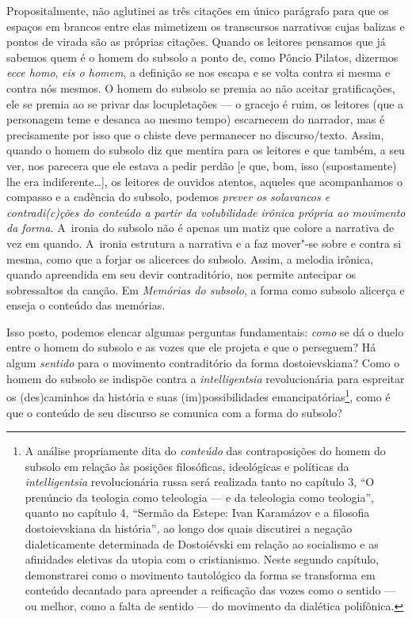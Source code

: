 Propositalmente, não aglutinei as três citações em único parágrafo para
que os espaços em brancos entre elas mimetizem os transcursos narrativos
cujas balizas e pontos de virada são as próprias citações. Quando os
leitores pensamos que já sabemos quem é o homem do subsolo a ponto de,
como Pôncio Pilatos, dizermos \emph{ecce homo}, \emph{eis o homem}, a
definição se nos escapa e se volta contra si mesma e contra nós mesmos.
O homem do subsolo se premia ao não aceitar gratificações, ele se premia
ao se privar das locupletações --- o gracejo é ruim, os leitores (que a
personagem teme e desanca ao mesmo tempo) escarnecem do narrador, mas é
precisamente por isso que o chiste deve permanecer no discurso/texto.
Assim, quando o homem do subsolo diz que mentira para os leitores e que
também, a seu ver, nos parecera que ele estava a pedir perdão {[}e que,
bom, isso (supostamente) lhe era indiferente\ldots{}{]}, os leitores de
ouvidos atentos, aqueles que acompanhamos o compasso e a cadência do
subsolo, podemos \emph{prever os solavancos e contradi(c)ções do
conteúdo a partir da volubilidade irônica própria ao movimento da
forma.} A~ironia do subsolo não é apenas um matiz que colore a narrativa
de vez em quando. A~ironia estrutura a narrativa e a faz mover"-se sobre
e contra si mesma, como que a forjar os alicerces do subsolo. Assim, a
melodia irônica, quando apreendida em seu devir contraditório, nos
permite antecipar os sobressaltos da canção. Em \emph{Memórias do
subsolo}, a forma como subsolo alicerça e enseja o conteúdo das
memórias.

Isso posto, podemos elencar algumas perguntas fundamentais: \emph{como}
se dá o duelo entre o homem do subsolo e as vozes que ele projeta e que
o perseguem? Há algum \emph{sentido} para o movimento contraditório da
forma dostoievskiana? Como o homem do subsolo se indispõe contra a
\emph{intelligentsia} revolucionária para espreitar os (des)caminhos da
história e suas (im)possibilidades emancipatórias\footnote{A análise
  propriamente dita do \emph{conteúdo} das contraposições do homem do
  subsolo em relação às posições filosóficas, ideológicas e políticas da
  \emph{intelligentsia} revolucionária russa será realizada tanto no
  capítulo 3, ``O prenúncio da teologia como teleologia --- e da
  teleologia como teologia'', quanto no capítulo 4, ``Sermão da Estepe:
  Ivan Karamázov e a filosofia dostoievskiana da história''\emph{,} ao
  longo dos quais discutirei a negação dialeticamente determinada de
  Dostoiévski em relação ao socialismo e as afinidades eletivas da
  utopia com o cristianismo. Neste segundo capítulo, demonstrarei como o
  movimento tautológico da forma se transforma em conteúdo decantado
  para apreender a reificação das vozes como o sentido --- ou melhor,
  como a falta de sentido --- do movimento da dialética polifônica.},
como é que o conteúdo de seu discurso se comunica com a forma do
subsolo?

